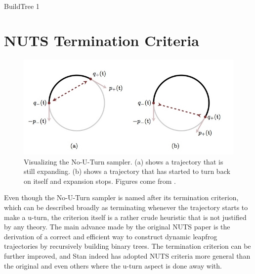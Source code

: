 \documentclass[12pt]{report}
\begin{document}
\begin{algorithm}

\caption{BuildTree 1}
\end{algorithm}


\section{NUTS Termination Criteria}

\begin{figure}[h!]
\includegraphics[scale=0.5]{cropped_nuts_image}
  \caption{Visualizing the No-U-Turn sampler. (a) shows a trajectory that is still expanding. (b) shows a trajectory that has started to turn back on itself and expansion stops. Figures come from \cite{betancourt2017conceptual}.}
  \label{nuts-figures}
\end{figure}

Even though the No-U-Turn sampler is named after its termination criterion, which can be described broadly as terminating whenever the trajectory starts to make a u-turn, the criterion itself is a rather crude heuristic that is not justified by any theory. The main advance made by the original NUTS paper \cite{hoffman2014no} is the derivation of a correct and efficient way to construct dynamic leapfrog trajectories by recursively building binary trees. The termination criterion can be further improved, and Stan indeed has adopted NUTS criteria more general than the original and even others where the u-turn aspect is done away with. 
\end{document}
